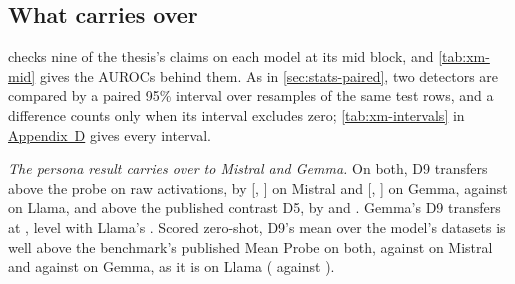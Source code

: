 \subsection{What carries over}
\label{sec:xm-replicates}

 checks nine of the thesis's claims on each model at its mid block, and
\cref{tab:xm-mid} gives the AUROCs behind them. As in \cref{sec:stats-paired}, two detectors are compared
by a paired 95\% interval over resamples of the same test rows, and a difference counts only when its
interval excludes zero; \cref{tab:xm-intervals} in \hyperref[app:xmodel]{Appendix~D} gives every interval.

\begin{table}[t]
\centering
\footnotesize
\setlength{\tabcolsep}{3.5pt}
\caption[The thesis's claims on the four models.]{The thesis's claims at each model's mid block: a paired
difference, or an AUROC with the value it must clear (or stay below) in brackets. \checkmark{} the claim
holds, $\times$ it does not, $\circ$ no clear difference (the interval includes zero, or the two values are
within 0.01). $^a$Qwen's identical reply, rebuilt from the raw files. $^b$Gemma's opening sentence, rebuilt,
 lies.}
\label{tab:xm-claims}
\fittable{}
\end{table}

\begin{table}[t]
\centering
\footnotesize
\caption[The main detectors at each model's mid block.]{The main detectors at each model's mid block.
Means are over the model's own datasets; lies caught use cutoffs set on half of each dataset's honest
answers.}
\label{tab:xm-mid}
\fittable{}
\end{table}

\emph{The persona result carries over to Mistral and Gemma.} On both, D9 transfers above the probe on raw
activations, by  [,
] on Mistral and 
[, ] on Gemma, against
 on Llama, and above the published contrast D5, by
 and . Gemma's D9 transfers at
, level with Llama's . Scored zero-shot, D9's mean over the
model's datasets is well above the benchmark's published Mean Probe on both, 
against  on Mistral and  against
 on Gemma, as it is on Llama ( against
).

